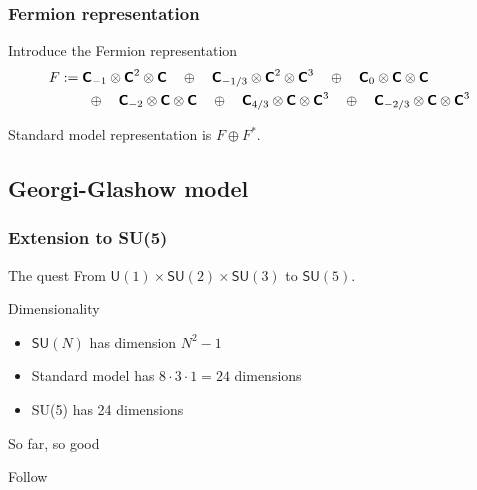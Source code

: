 \documentclass[english, fleqn]{beamer}
\begin{document}
\begin{frame}
    \frametitle{Fermion representation}

    Introduce the Fermion representation
    \begin{align*}
        F &:= 
        \text{\bfseries\sffamily{C}}_{-1} \otimes \text{\bfseries\sffamily{C}}^2 \otimes \text{\bfseries\sffamily{C}}
        \quad\oplus\quad \text{\bfseries\sffamily{C}}_{-1/3} \otimes \text{\bfseries\sffamily{C}}^2 \otimes \text{\bfseries\sffamily{C}}^3
        \quad\oplus\quad \text{\bfseries\sffamily{C}}_{0} \otimes \text{\bfseries\sffamily{C}} \otimes \text{\bfseries\sffamily{C}}
        \\&\qquad\oplus\quad \text{\bfseries\sffamily{C}}_{-2} \otimes \text{\bfseries\sffamily{C}} \otimes \text{\bfseries\sffamily{C}}
        \quad\oplus\quad \text{\bfseries\sffamily{C}}_{4/3} \otimes \text{\bfseries\sffamily{C}} \otimes \text{\bfseries\sffamily{C}}^3
        \quad\oplus\quad \text{\bfseries\sffamily{C}}_{-2/3} \otimes \text{\bfseries\sffamily{C}} \otimes \text{\bfseries\sffamily{C}}^3
    \end{align*}

    \pause

    Standard model representation is $F \oplus F^*$.
\end{frame}

\subsection{Georgi-Glashow model}

\begin{frame}
    \frametitle{Extension to SU(5)}
    \begin{block}{The quest}
        From $\mathsf{U}(1) \times \mathsf{SU}(2) \times \mathsf{SU}(3)$ to $\mathsf{SU}(5)$.
    \end{block}
    
    \pause

    \begin{block}{Dimensionality}
        \begin{itemize}
            \item $\mathsf{SU}(N)$ has dimension $N^2 - 1$
            \item Standard model has $8 \cdot 3 \cdot 1 = 24$ dimensions
            \item SU(5) has 24 dimensions
        \end{itemize}
        So far, so good
    \end{block}
        
    \pause

    Follow 
\end{frame}
\end{document}
